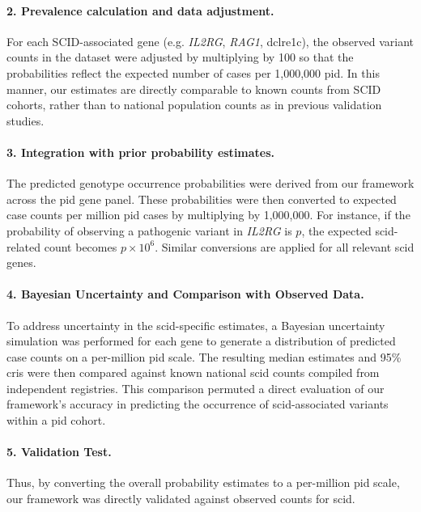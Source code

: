 \paragraph{2. Prevalence calculation and data adjustment.}
For each SCID-associated gene (e.g. \textit{IL2RG}, \textit{RAG1}, \ac{dclre1c}), the observed variant counts in the dataset were adjusted by multiplying by 100 so that the probabilities reflect the expected number of cases per 1,000,000 \ac{pid}. 
In this manner, our estimates are directly comparable to known counts from SCID cohorts, rather than to national population counts as in previous validation studies.

\paragraph{3. Integration with prior probability estimates.}
The predicted genotype occurrence probabilities were derived from our framework across the \ac{pid} gene panel. 
These probabilities were then converted to expected case counts per million  \ac{pid} cases by multiplying by 1,000,000. 
For instance, if the probability of observing a pathogenic variant in \textit{IL2RG} is \(p\), the expected \ac{scid}-related count becomes \(p \times 10^6\). Similar conversions are applied for all relevant \ac{scid} genes.

\paragraph{4. Bayesian Uncertainty and Comparison with Observed Data.}
To address uncertainty in the \ac{scid}-specific estimates, a Bayesian uncertainty simulation was performed for each gene to generate a distribution of predicted case counts on a per-million \ac{pid} scale. 
The resulting median estimates and 95\% \ac{cri}s were then compared against known national \ac{scid} counts compiled from independent registries. 
This comparison permuted a direct evaluation of our framework’s accuracy in predicting the occurrence of \ac{scid}-associated variants within a \ac{pid} cohort.

\paragraph{5. Validation Test.}
Thus, by converting the overall probability estimates to a per-million \ac{pid} scale, our framework was directly validated against observed counts for \ac{scid}. %

